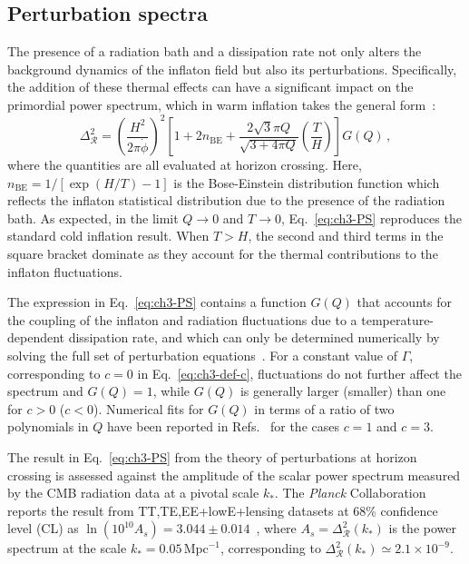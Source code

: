 \subsection{Perturbation spectra}

The presence of a radiation bath and a dissipation rate not only alters the background dynamics of the inflaton field but also its perturbations. Specifically, the addition of these thermal effects can have a significant impact on the primordial power spectrum, which in warm inflation takes the general form~\cite{Hall:2003zp, Graham:2009bf, Bastero-Gil:2011rva, Ramos:2013nsa}:
\begin{equation}
    \label{eq:ch3-PS}
    \Delta_{\mathcal{R}}^{2}=\left(\frac{H^{2}}{2 \pi \dot{\phi}}\right)^{2}\left[1+2 n_{\mathrm{BE}}+\frac{2 \sqrt{3} \pi Q}{\sqrt{3+4 \pi Q}} \left(\frac{T}{H}\right)\right] G(Q)\,,
\end{equation}
where the quantities are all evaluated at horizon crossing. Here, $n_{\mathrm{BE}} =1/\left[\exp(H/T)-1\right]$ is the Bose-Einstein distribution function which reflects the inflaton statistical distribution due to the presence of the radiation bath. As expected, in the limit $Q \to 0$ and $T \to 0$, Eq.~\ref{eq:ch3-PS} reproduces the standard cold inflation result. When $T>H$, the second and third terms in the square bracket dominate as they account for the thermal contributions to the inflaton fluctuations.

The expression in Eq.~\ref{eq:ch3-PS} contains a function $G(Q)$ that accounts for the coupling of the inflaton and radiation fluctuations due to a temperature-dependent dissipation rate, and which can only be determined numerically by solving the full set of perturbation equations~\cite{Graham:2009bf, Bastero-Gil:2011rva}. For a constant value of $\Gamma$, corresponding to $c=0$ in Eq.~\ref{eq:ch3-def-c}, fluctuations do not further affect the spectrum and $G(Q) = 1$, while $G(Q)$ is generally larger (smaller) than one for $c >0$ ($c<0$). Numerical fits for $G(Q)$ in terms of a ratio of two polynomials in $Q$ have been reported in Refs.~\cite{Bastero-Gil:2016qru, Benetti:2016jhf} for the cases $c = 1$ and $c=3$.

The result in Eq.~\ref{eq:ch3-PS} from the theory of perturbations at horizon crossing is assessed against the amplitude of the scalar power spectrum measured by the CMB radiation data at a pivotal scale $k_*$. The \textit{Planck} Collaboration reports the result from TT,TE,EE+lowE+lensing datasets at 68\% confidence level (CL) as $\ln(10^{10}A_s) = 3.044\pm 0.014$~\cite{Planck:2018vyg}, where $A_s = \Delta_{\mathcal{R}}^2(k_{*})$ is the power spectrum at the scale $k_{*} = 0.05\,\mathrm{Mpc}^{-1}$, corresponding to $\Delta_{\mathcal{R}}^2(k_{*}) \simeq 2.1 \times 10^{-9}$.


